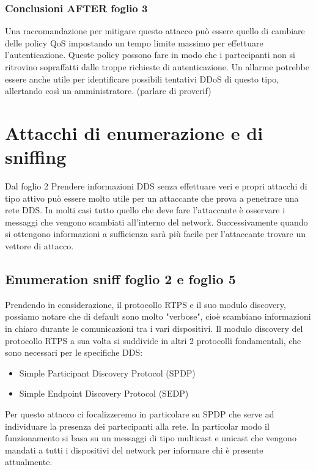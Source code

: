 \subsubsection{Conclusioni AFTER foglio 3}
Una raccomandazione per mitigare questo attacco può essere quello di cambiare delle
policy QoS impostando un tempo limite massimo per effettuare
l'autenticazione. Queste policy possono fare in modo
che i partecipanti non si ritrovino sopraffatti dalle troppe richieste di
autenticazione. Un allarme potrebbe essere anche utile per identificare possibili
tentativi DDoS di questo tipo, allertando così un amministratore. (parlare di proverif)


\section{Attacchi di enumerazione e di sniffing}
Dal foglio 2
Prendere informazioni DDS senza effettuare veri e propri
attacchi di tipo attivo può essere molto utile per un attaccante che prova
a penetrare una rete DDS. In molti casi tutto quello che deve fare l'attaccante
è osservare i messaggi che vengono scambiati all'interno del network.
Successivamente quando si ottengono informazioni a sufficienza sarà più
facile per l'attaccante trovare un vettore di attacco.


\subsection{Enumeration sniff foglio 2 e foglio 5}
Prendendo in considerazione, il protocollo RTPS e il suo modulo discovery,
possiamo notare che di default sono molto "verbose", cioè scambiano 
informazioni in
chiaro durante le comunicazioni tra i vari dispositivi. Il modulo 
discovery del protocollo RTPS a sua volta si suddivide in
altri 2 protocolli fondamentali, che sono necessari per le specifiche DDS:
\begin{itemize}
    \item Simple Participant Discovery Protocol (SPDP)
    \item Simple Endpoint Discovery Protocol (SEDP)
\end{itemize}
Per questo attacco ci focalizzeremo in particolare su SPDP che serve ad
individuare la presenza dei partecipanti alla rete. In particolar modo
il funzionamento si basa su un messaggi di tipo multicast e unicast che vengono
mandati a tutti i dispositivi del network per informare chi è presente attualmente.


